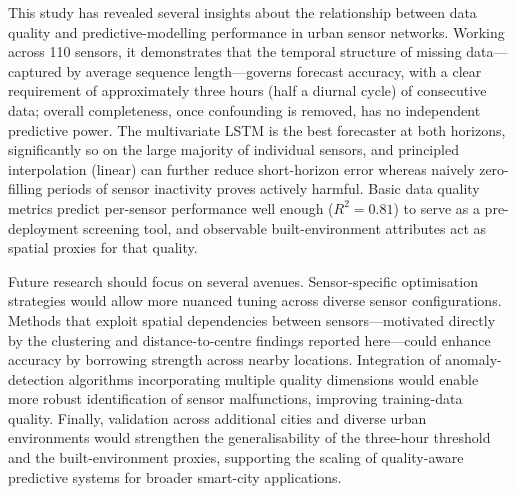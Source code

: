 \documentclass[journal,sensors,submit,pdftex,moreauthors]{Definitions/mdpi}
\begin{document}
This study has revealed several insights about the relationship between data quality and predictive-modelling performance in urban sensor networks. Working across 110 sensors, it demonstrates that the temporal structure of missing data---captured by average sequence length---governs forecast accuracy, with a clear requirement of approximately three hours (half a diurnal cycle) of consecutive data; overall completeness, once confounding is removed, has no independent predictive power. The multivariate LSTM is the best forecaster at both horizons, significantly so on the large majority of individual sensors, and principled interpolation (linear) can further reduce short-horizon error whereas naively zero-filling periods of sensor inactivity proves actively harmful. Basic data quality metrics predict per-sensor performance well enough ($R^2 = 0.81$) to serve as a pre-deployment screening tool, and observable built-environment attributes act as spatial proxies for that quality.

Future research should focus on several avenues. Sensor-specific optimisation strategies would allow more nuanced tuning across diverse sensor configurations. Methods that exploit spatial dependencies between sensors---motivated directly by the clustering and distance-to-centre findings reported here---could enhance accuracy by borrowing strength across nearby locations. Integration of anomaly-detection algorithms incorporating multiple quality dimensions would enable more robust identification of sensor malfunctions, improving training-data quality. Finally, validation across additional cities and diverse urban environments would strengthen the generalisability of the three-hour threshold and the built-environment proxies, supporting the scaling of quality-aware predictive systems for broader smart-city applications.

\vspace{6pt}









\end{document}
